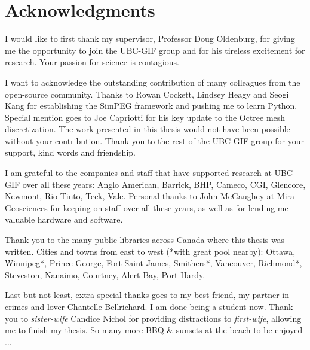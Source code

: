 
\chapter{Acknowledgments}
I would like to first thank my supervisor, Professor Doug Oldenburg, for giving me the opportunity to join the UBC-GIF group and for his tireless excitement for research. Your passion for science is contagious.

I want to acknowledge the outstanding contribution of many colleagues from the open-source community. Thanks to Rowan Cockett, Lindsey Heagy and Seogi Kang for establishing the SimPEG framework and pushing me to learn Python. Special mention goes to Joe Capriotti for his key update to the Octree mesh discretization. The work presented in this thesis would not have been possible without your contribution. Thank you to the rest of the UBC-GIF group for your support, kind words and friendship.

I am grateful to the companies and staff that have supported research at UBC-GIF over all these years: Anglo American, Barrick, BHP, Cameco, CGI, Glencore, Newmont, Rio Tinto, Teck, Vale. Personal thanks to John McGaughey at Mira Geosciences for keeping on staff over all these years, as well as for lending me valuable hardware and software.

Thank you to the many public libraries across Canada where this thesis was written. Cities and towns from east to west (*with great pool nearby):
Ottawa, Winnipeg*, Prince George, Fort Saint-James, Smithers*, Vancouver, Richmond*, Steveston, Nanaimo, Courtney, Alert Bay, Port Hardy.

Last but not least, extra special thanks goes to my best friend, my partner in crimes and lover Chantelle Bellrichard. I am done being a student now. Thank you to \emph{sister-wife} Candice Nichol for providing distractions to \emph{first-wife}, allowing me to finish my thesis. So many more BBQ \& sunsets at the beach to be enjoyed ...


